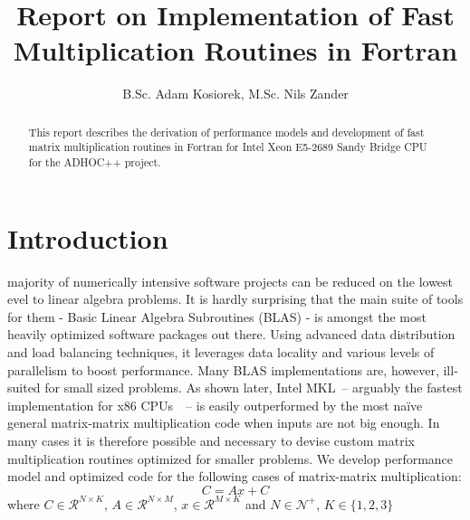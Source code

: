 \documentclass[journal, a4paper]{IEEEtran}
\begin{document}
	\title{Report on Implementation of Fast Multiplication Routines in Fortran}
	\author{B.Sc. Adam Kosiorek, M.Sc. Nils Zander}	
	\maketitle
	


\begin{abstract}
 This report describes the derivation of performance models and development of fast matrix multiplication routines in Fortran for Intel Xeon E5-2689 Sandy Bridge CPU for the ADHOC++ project.
\end{abstract}

\section{Introduction}
     majority of numerically intensive software projects can be reduced on the lowest evel to linear algebra problems. It is hardly surprising that the main suite of tools for them - Basic Linear Algebra Subroutines (BLAS) - is amongst the most heavily optimized software packages out there. Using advanced data distribution and load balancing techniques, it leverages data locality and various levels of parallelism to boost performance. Many BLAS implementations are, however, ill-suited for small sized problems. As shown later, Intel MKL~-- arguably the fastest implementation for x86 CPUs~\cite{MKL}~-- is easily outperformed by the most na\"ive general matrix-matrix multiplication code when inputs are not big enough. In many cases it is therefore possible and necessary to devise custom matrix multiplication routines optimized for smaller problems. We develop performance model and optimized code for the following cases of matrix-matrix multiplication:
    \begin{equation}
     C = Ax + C
    \end{equation}
    where $C \in \mathcal{R}^{N \times K}$, $A \in \mathcal{R}^{N \times M}$, $x \in \mathcal{R}^{M \times K}$ and $N \in \mathcal{N}^+$, $K \in \{1, 2, 3\}$
\end{document}
